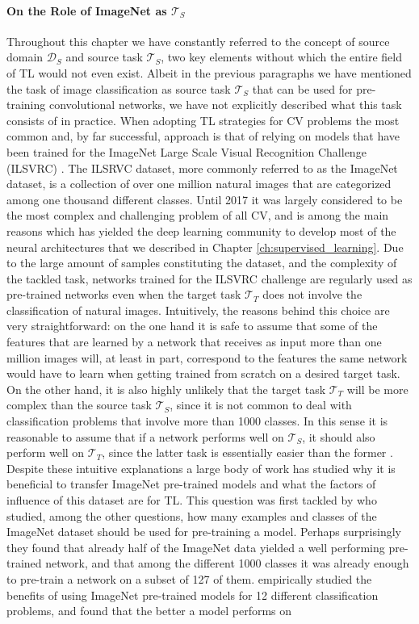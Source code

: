 \paragraph{On the Role of ImageNet as $\mathcal{T}_S$} Throughout this chapter we have constantly referred to the concept of source domain $\mathcal{D}_S$ and source task $\mathcal{T}_S$, two key elements without which the entire field of TL would not even exist. Albeit in the previous paragraphs we have mentioned the task of image classification as source task $\mathcal{T}_S$ that can be used for pre-training convolutional networks, we have not explicitly described what this task consists of in practice. When adopting TL strategies for CV problems the most common and, by far successful, approach is that of relying on models that have been trained for the ImageNet Large Scale Visual Recognition Challenge (ILSVRC) \cite{russakovsky2015imagenet}. The ILSRVC dataset, more commonly referred to as the ImageNet dataset, is a collection of over one million natural images that are categorized among one thousand different classes. Until 2017 it was largely considered to be the most complex and challenging problem of all CV, and is among the main reasons which has yielded the deep learning community to develop most of the neural architectures that we described in Chapter \ref{ch:supervised_learning}. Due to the large amount of samples constituting the dataset, and the complexity of the tackled task, networks trained for the ILSVRC challenge are regularly used as pre-trained networks even when the target task $\mathcal{T}_T$ does not involve the classification of natural images. Intuitively, the reasons behind this choice are very straightforward: on the one hand it is safe to assume that some of the features that are learned by a network that receives as input more than one million images will, at least in part, correspond to the features the same network would have to learn when getting trained from scratch on a desired target task. On the other hand, it is also highly unlikely that the target task $\mathcal{T}_T$ will be more complex than the source task $\mathcal{T}_S$, since it is not common to deal with classification problems that involve more than 1000 classes. In this sense it is reasonable to assume that if a network performs well on $\mathcal{T}_S$, it should also perform well on $\mathcal{T}_T$, since the latter task is essentially easier than the former \cite{mensink2021factors}. Despite these intuitive explanations a large body of work has studied why it is beneficial to transfer ImageNet pre-trained models and what the factors of influence of this dataset are for TL. This question was first tackled by \citet{huh2016makes} who studied, among the other questions, how many examples and classes of the ImageNet dataset should be used for pre-training a model. Perhaps surprisingly they found that already half of the ImageNet data yielded a well performing pre-trained network, and that among the different 1000 classes it was already enough to pre-train a network on a subset of 127 of them. \citet{kornblith2019better} empirically studied the benefits of using ImageNet pre-trained models for 12 different classification problems, and found that the better a model performs on 